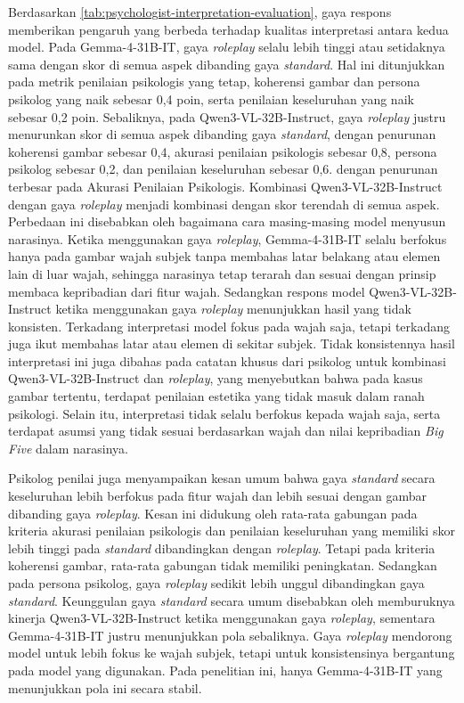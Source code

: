 Berdasarkan \autoref{tab:psychologist-interpretation-evaluation}, gaya respons memberikan pengaruh yang berbeda terhadap kualitas interpretasi antara kedua model. Pada Gemma-4-31B-IT, gaya \textit{roleplay} selalu lebih tinggi atau setidaknya sama dengan skor di semua aspek dibanding gaya \textit{standard}. Hal ini ditunjukkan pada metrik penilaian psikologis yang tetap, koherensi gambar dan persona psikolog yang naik sebesar 0,4 poin, serta penilaian keseluruhan yang naik sebesar 0,2 poin. Sebaliknya, pada Qwen3-VL-32B-Instruct, gaya \textit{roleplay} justru menurunkan skor di semua aspek dibanding gaya \textit{standard}, dengan penurunan koherensi gambar sebesar 0,4, akurasi penilaian psikologis sebesar 0,8, persona psikolog sebesar 0,2, dan penilaian keseluruhan sebesar 0,6. dengan penurunan terbesar pada Akurasi Penilaian Psikologis. Kombinasi Qwen3-VL-32B-Instruct dengan gaya \textit{roleplay} menjadi kombinasi dengan skor terendah di semua aspek. Perbedaan ini disebabkan oleh bagaimana cara masing-masing model menyusun narasinya. Ketika menggunakan gaya \textit{roleplay}, Gemma-4-31B-IT	 selalu berfokus hanya pada gambar wajah subjek tanpa membahas latar belakang atau elemen lain di luar wajah, sehingga narasinya tetap terarah dan sesuai dengan prinsip membaca kepribadian dari fitur wajah. Sedangkan respons model Qwen3-VL-32B-Instruct ketika menggunakan gaya \textit{roleplay} menunjukkan hasil yang tidak konsisten. Terkadang interpretasi model fokus pada wajah saja, tetapi terkadang juga ikut membahas latar atau elemen di sekitar subjek. Tidak konsistennya hasil interpretasi ini juga dibahas pada catatan khusus dari psikolog untuk kombinasi Qwen3-VL-32B-Instruct dan \textit{roleplay}, yang menyebutkan bahwa pada kasus gambar tertentu, terdapat penilaian estetika yang tidak masuk dalam ranah psikologi. Selain itu, interpretasi tidak selalu berfokus kepada wajah saja, serta terdapat asumsi yang tidak sesuai berdasarkan wajah dan nilai kepribadian \textit{Big Five} dalam narasinya.

Psikolog penilai juga menyampaikan kesan umum bahwa gaya \textit{standard} secara keseluruhan lebih berfokus pada fitur wajah dan lebih sesuai dengan gambar dibanding gaya \textit{roleplay}. Kesan ini didukung oleh rata-rata gabungan pada kriteria akurasi penilaian psikologis dan penilaian keseluruhan yang memiliki skor lebih tinggi pada \textit{standard} dibandingkan dengan \textit{roleplay}. Tetapi pada kriteria koherensi gambar, rata-rata gabungan tidak memiliki peningkatan. Sedangkan pada persona psikolog, gaya \textit{roleplay} sedikit lebih unggul dibandingkan gaya \textit{standard}. Keunggulan gaya \textit{standard} secara umum disebabkan oleh memburuknya kinerja Qwen3-VL-32B-Instruct ketika menggunakan gaya \textit{roleplay}, sementara Gemma-4-31B-IT justru menunjukkan pola sebaliknya. Gaya \textit{roleplay} mendorong model untuk lebih fokus ke wajah subjek, tetapi untuk konsistensinya bergantung pada model yang digunakan. Pada penelitian ini, hanya Gemma-4-31B-IT yang menunjukkan pola ini secara stabil.

